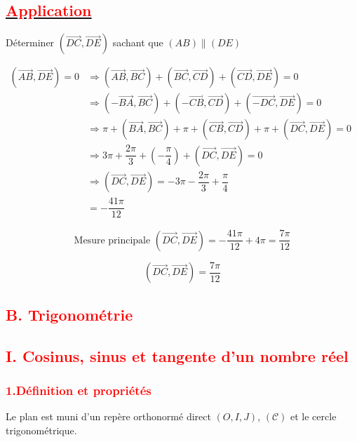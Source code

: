 \documentclass[a4paper,12pt]{article}
\begin{document}
\subsection*{\underline{\textcolor{red}{Application}}}

Déterminer \( (\overrightarrow{DC}, \overrightarrow{DE}) \) sachant que \( (AB) \parallel (DE) \)

\(
\begin{aligned}
(\overrightarrow{AB}, \overrightarrow{DE}) = 0 &\Rightarrow (\overrightarrow{AB}, \overrightarrow{BC}) + (\overrightarrow{BC}, \overrightarrow{CD}) + (\overrightarrow{CD}, \overrightarrow{DE}) = 0\\
&\Rightarrow (-\overrightarrow{BA}, \overrightarrow{BC}) + (-\overrightarrow{CB}, \overrightarrow{CD}) + (\overrightarrow{-DC}, \overrightarrow{DE}) = 0\\
&\Rightarrow \pi + (\overrightarrow{BA}, \overrightarrow{BC}) + \pi + (\overrightarrow{CB}, \overrightarrow{CD}) + \pi + (\overrightarrow{DC}, \overrightarrow{DE}) = 0\\
&\Rightarrow 3\pi + \dfrac{2\pi}{3} + \left( -\dfrac{\pi}{4} \right) + (\overrightarrow{DC}, \overrightarrow{DE}) = 0\\
&\Rightarrow (\overrightarrow{DC}, \overrightarrow{DE}) = - 3\pi - \dfrac{2\pi}{3} + \dfrac{\pi}{4}\\
&=-\dfrac{41\pi}{12}
\end{aligned}
\)

\[
\text{Mesure principale } (\overrightarrow{DC}, \overrightarrow{DE}) = -\dfrac{41\pi}{12} + 4\pi =   \dfrac{7\pi}{12}
\]

\[
\boxed{(\overrightarrow{DC}, \overrightarrow{DE}) = \dfrac{7\pi}{12}}
\]

\subsection*{\textcolor{red}{B. Trigonométrie}}

\subsection*{\textcolor{red}{I. Cosinus, sinus et tangente d’un nombre réel}}

\subsubsection*{\textcolor{red}{1.Définition et propriétés }}

Le plan est muni d’un repère orthonormé direct \( (O, I, J) \), $\mathcal{(C)}$ et le cercle trigonométrique.
\end{document}
